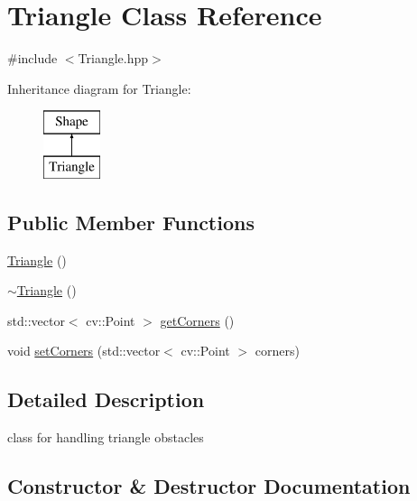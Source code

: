 \hypertarget{class_triangle}{}\section{Triangle Class Reference}
\label{class_triangle}


{\ttfamily \#include $<$Triangle.\+hpp$>$}

Inheritance diagram for Triangle\+:\begin{figure}[H]
\begin{center}
\leavevmode
\includegraphics[height=2.000000cm]{class_triangle}
\end{center}
\end{figure}
\subsection*{Public Member Functions}
\begin{DoxyCompactItemize}
\item 
\mbox{\hyperlink{class_triangle_aaefe4ed500c07918d30c6f0e286332c5}{Triangle}} ()
\item 
\mbox{\hyperlink{class_triangle_a5199760a17454f4dc94c855a57e3a152}{$\sim$\+Triangle}} ()
\item 
std\+::vector$<$ cv\+::\+Point $>$ \mbox{\hyperlink{class_triangle_a0c77555fd0e47f1344c23fa880f43777}{get\+Corners}} ()
\item 
void \mbox{\hyperlink{class_triangle_ad2d4cecee7e87e10d8b2787199d784c2}{set\+Corners}} (std\+::vector$<$ cv\+::\+Point $>$ corners)
\end{DoxyCompactItemize}


\subsection{Detailed Description}
class for handling triangle obstacles 

\subsection{Constructor \& Destructor Documentation}
\mbox{\label{class_triangle_aaefe4ed500c07918d30c6f0e286332c5}} 
